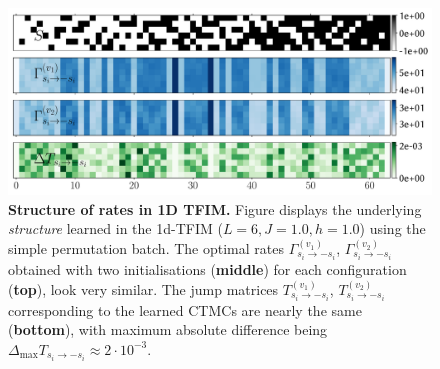 \begin{figure}[t]
	\centering
	\includegraphics[width=\linewidth]{Chapter5/Figs/Vector/rate_structure.pdf}
	\caption[Structure of learned rates for 1D TFIM]{\textbf{Structure of rates in 1D TFIM.} Figure displays the underlying \emph{structure} learned in the 1d-TFIM ($L=6, J=1.0, h=1.0$) using the simple permutation batch. The optimal rates $\Gamma^{(v_1)}_{s_i \rightarrow -s_i}$, $\Gamma^{(v_2)}_{s_i \rightarrow -s_i}$ obtained with two initialisations (\textbf{middle}) for each configuration (\textbf{top}), look very similar. The jump matrices $T^{(v_1)}_{s_i \rightarrow -s_i}$, $T^{(v_2)}_{s_i \rightarrow -s_i}$ corresponding to the learned CTMCs are nearly the same (\textbf{bottom}), with maximum absolute difference being $\Delta_{\text{max}} T_{s_i \rightarrow -s_i} \approx 2\cdot10^{-3}$.}
	\label{fig:rate_structure}
\end{figure}

